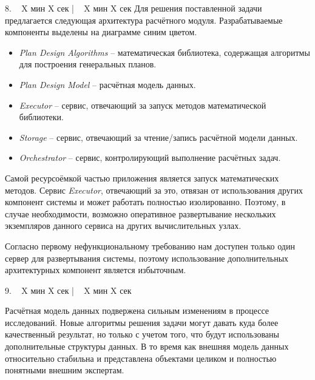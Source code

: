 \documentclass[a4paper,14pt]{extarticle}
\begin{document}
    8. ~ X мин X сек | ~ X мин X сек
    Для решения поставленной задачи предлагается следующая архитектура расчётного модуля.
    Разрабатываемые компоненты выделены на диаграмме синим цветом.
    \begin{itemize}
        \item \textit{Plan Design Algorithms} -- математическая библиотека, содержащая алгоритмы
        для построения генеральных планов.
        \item \textit{Plan Design Model} -- расчётная модель данных.
        \item \textit{Executor} -- сервис, отвечающий за запуск методов математической библиотеки.
        \item \textit{Storage} -- сервис, отвечающий за чтение/запись расчётной модели данных.
        \item \textit{Orchestrator} -- сервис, контролирующий выполнение расчётных задач.

    \end{itemize}

    Самой ресурсоёмкой частью приложения является запуск математических методов.
    Сервис \textit{Executor}, отвечающий за это, отвязан от использования других компонент системы
    и может работать полностью изолированно.
    Поэтому, в случае необходимости, возможно оперативное развертывание нескольких экземпляров данного сервиса
    на других вычислительных узлах.

    Согласно первому нефункциональному требованию нам доступен только один сервер для развертывания
    системы, поэтому использование дополнительных архитектурных компонент является избыточным.

    9. ~ X мин X сек | ~ X мин X сек

    Расчётная модель данных подвержена сильным изменениям в процессе исследований.
    Новые алгоритмы решения задачи могут давать куда более качественный результат, но только с учетом того, что
    будут использованы дополнительные структуры данных. В то время как внешняя модель данных относительно стабильна
    и представлена объектами целиком и полностью понятными внешним экспертам.
\end{document}
